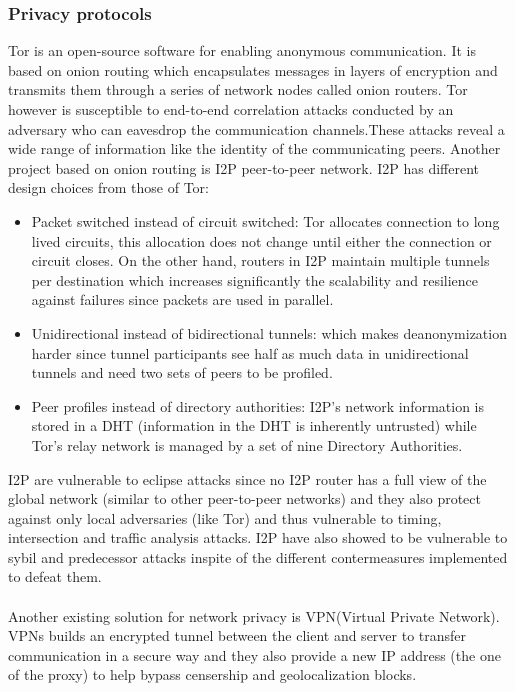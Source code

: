 \subsubsection{Privacy protocols}
Tor is an open-source software for enabling anonymous communication. It is based on onion routing which encapsulates messages in layers of encryption and transmits them through a series of network nodes called onion routers. Tor however is susceptible to end-to-end correlation attacks conducted by an adversary who can eavesdrop the communication channels.These attacks reveal a wide range of information like the identity of the communicating peers.
Another project based on onion routing is I2P peer-to-peer network. I2P has different design choices from those of Tor:
\begin{itemize}
    \item Packet switched instead of circuit switched: Tor allocates connection to long lived circuits, this allocation does not change until either the connection or circuit closes. On the other hand, routers in I2P maintain multiple tunnels per destination which increases significantly the scalability and resilience against failures since packets are used in parallel.
    \item Unidirectional instead of bidirectional tunnels: which makes deanonymization harder since tunnel participants see half as much data in unidirectional tunnels and need two sets of peers to be profiled.
    \item Peer profiles instead of directory authorities: I2P’s network information is stored in a DHT (information in the DHT is inherently untrusted) while Tor’s relay network is managed by a set of nine Directory Authorities.

\end{itemize}
I2P are vulnerable to eclipse attacks since no I2P router has a full view of the global network (similar to other peer-to-peer networks) and they also protect against only local adversaries (like Tor) and thus vulnerable to timing, intersection and traffic analysis attacks. I2P have also showed to be vulnerable to sybil and predecessor attacks inspite of the different contermeasures implemented to defeat them.
\\~\\Another existing solution for network privacy is VPN(Virtual Private Network). 
VPNs builds an encrypted tunnel between the client and server to transfer communication in a secure way and they also provide a new IP address (the one of the proxy) to help bypass censership and geolocalization blocks.
